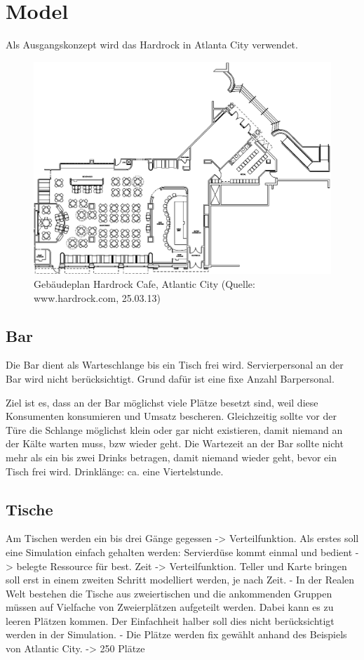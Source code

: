 \documentclass[ngerman,a4paper,12pt]{scrreprt}
\begin{document}
\section{Model}
Als Ausgangskonzept wird das Hardrock in Atlanta City verwendet.
\begin{figure}[htp]
	\centering
		\includegraphics[width=1\textwidth]{img/hardrock-plan.png}
		\caption[Gebäudeplan Hardrock]{Gebäudeplan Hardrock Cafe, Atlantic City (Quelle: www.hardrock.com, 25.03.13)}
		\label{planHardrock}
\end{figure}

\subsection{Bar}
Die Bar dient als Warteschlange bis ein Tisch frei wird.
Servierpersonal an der Bar wird nicht berücksichtigt. Grund dafür ist eine fixe Anzahl Barpersonal.

Ziel ist es, dass an der Bar möglichst viele Plätze besetzt sind, weil diese Konsumenten konsumieren und Umsatz bescheren. Gleichzeitig sollte vor der Türe die Schlange möglichst klein oder gar nicht existieren, damit niemand an der Kälte warten muss, bzw wieder geht. Die Wartezeit an der Bar sollte nicht mehr als ein bis zwei Drinks betragen, damit niemand wieder geht, bevor ein Tisch frei wird.
Drinklänge: ca. eine Viertelstunde.

\subsection{Tische}
Am Tischen werden ein bis drei Gänge gegessen -> Verteilfunktion.
Als erstes soll eine Simulation einfach gehalten werden:
Servierdüse kommt einmal und bedient -> belegte Ressource für best. Zeit -> Verteilfunktion.
Teller und Karte bringen soll erst in einem zweiten Schritt modelliert werden, je nach Zeit.
- In der Realen Welt bestehen die Tische aus zweiertischen und die ankommenden Gruppen müssen auf Vielfache von Zweierplätzen aufgeteilt werden. Dabei kann es zu leeren Plätzen kommen. Der Einfachheit halber soll dies nicht berücksichtigt werden in der Simulation.
- Die Plätze werden fix gewählt anhand des Beispiels von Atlantic City. -> 250 Plätze
\end{document}
